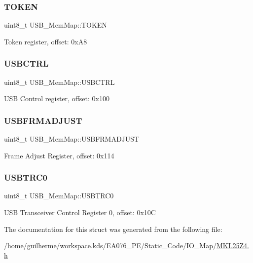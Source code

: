 \subsubsection{\texorpdfstring{T\+O\+K\+EN}{TOKEN}}
{\footnotesize\ttfamily uint8\+\_\+t U\+S\+B\+\_\+\+Mem\+Map\+::\+T\+O\+K\+EN}

Token register, offset\+: 0x\+A8 \mbox{\label{struct_u_s_b___mem_map_a593a3dc10eb92a0dab6f62dbda5f0209}} 
\subsubsection{\texorpdfstring{U\+S\+B\+C\+T\+RL}{USBCTRL}}
{\footnotesize\ttfamily uint8\+\_\+t U\+S\+B\+\_\+\+Mem\+Map\+::\+U\+S\+B\+C\+T\+RL}

U\+SB Control register, offset\+: 0x100 \mbox{\label{struct_u_s_b___mem_map_a1bb1b3975dfcbbe78635e2d08b16553d}} 
\subsubsection{\texorpdfstring{U\+S\+B\+F\+R\+M\+A\+D\+J\+U\+ST}{USBFRMADJUST}}
{\footnotesize\ttfamily uint8\+\_\+t U\+S\+B\+\_\+\+Mem\+Map\+::\+U\+S\+B\+F\+R\+M\+A\+D\+J\+U\+ST}

Frame Adjust Register, offset\+: 0x114 \mbox{\label{struct_u_s_b___mem_map_a10d494a848ee49ff264d62eb0bfb439e}} 
\subsubsection{\texorpdfstring{U\+S\+B\+T\+R\+C0}{USBTRC0}}
{\footnotesize\ttfamily uint8\+\_\+t U\+S\+B\+\_\+\+Mem\+Map\+::\+U\+S\+B\+T\+R\+C0}

U\+SB Transceiver Control Register 0, offset\+: 0x10C 

The documentation for this struct was generated from the following file\+:\begin{DoxyCompactItemize}
\item 
/home/guilherme/workspace.\+kds/\+E\+A076\+\_\+\+P\+E/\+Static\+\_\+\+Code/\+I\+O\+\_\+\+Map/\hyperlink{_m_k_l25_z4_8h}{M\+K\+L25\+Z4.\+h}\end{DoxyCompactItemize}
